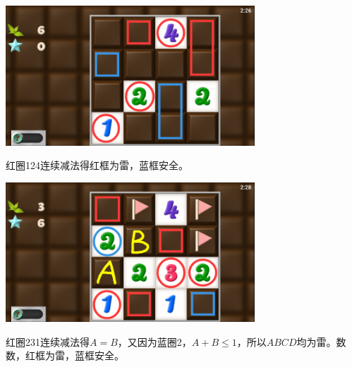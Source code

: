 \subsection{} %
\begin{center}
    \includegraphics[width=0.7\textwidth]{puzzle/147-1.png}
\end{center}
红圈124连续减法得红框为雷，蓝框安全。
\begin{center}
    \includegraphics[width=0.7\textwidth]{puzzle/147-2.png}
\end{center}
红圈231连续减法得$A=B$，又因为蓝圈2，$A+B\le 1$，所以$ABCD$均为雷。数数，红框为雷，蓝框安全。

